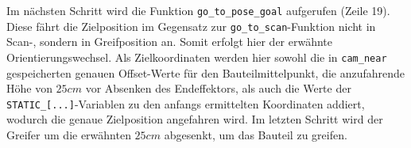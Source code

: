 Im nächsten Schritt wird die Funktion \lstinline{go_to_pose_goal} aufgerufen (Zeile 19). Diese fährt die Zielposition im Gegensatz zur \lstinline{go_to_scan}-Funktion nicht in \mbox{Scan-,} sondern in Greifposition an. Somit erfolgt hier der erwähnte Orientierungswechsel. Als Zielkoordinaten werden hier sowohl die in \lstinline{cam_near} gespeicherten genauen Offset-Werte für den Bauteilmittelpunkt, die anzufahrende Höhe von $25cm$ vor Absenken des Endeffektors, als auch die Werte der \lstinline{STATIC_[...]}-Variablen zu den anfangs ermittelten Koordinaten addiert, wodurch die genaue Zielposition angefahren wird. Im letzten Schritt wird der Greifer um die erwähnten $25cm$ abgesenkt, um das Bauteil zu greifen.
